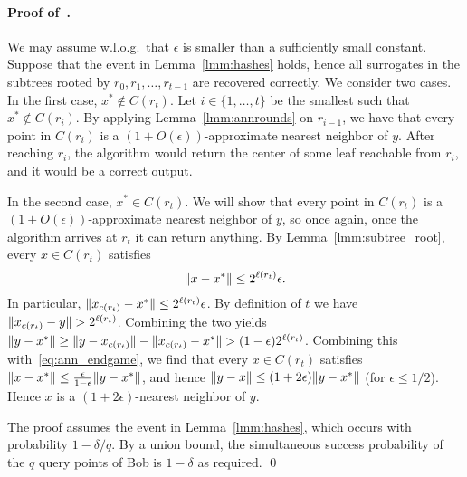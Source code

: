 \paragraph{Proof of~.}
We may assume w.l.o.g.~that $\epsilon$ is smaller than a sufficiently small constant.
Suppose that the event in Lemma~\ref{lmm:hashes} holds, hence all surrogates in the subtrees rooted by $r_0,r_1,\ldots,r_{t-1}$ are recovered correctly.
We consider two cases. In the first case, $x^*\notin C(r_t)$.
Let $i\in\{1,\ldots,t\}$ be the smallest such that $x^*\notin C(r_i)$.
By applying Lemma~\ref{lmm:annrounds} on $r_{i-1}$, we have that every point in $C(r_i)$ is a $(1+O(\epsilon))$-approximate nearest neighbor of $y$. After reaching $r_i$, the algorithm would return the center of some leaf reachable from $r_i$, and it would be a correct output.

In the second case, $x^*\in C(r_t)$. We will show that every point in $C(r_t)$ is a $(1+O(\epsilon))$-approximate nearest neighbor of $y$, so once again, once the algorithm arrives at $r_t$ it can return anything.
By Lemma~\ref{lmm:subtree_root}, every $x\in C(r_t)$ satisfies
\begin{equation}\label{eq:ann_endgame}
\lVert x-x^*\rVert \leq  2^{\ell(r_t)}\epsilon .
\end{equation}
In particular, $\lVert x_{c(r_t)}-x^*\rVert \leq 2^{\ell(r_t)}\epsilon$.
By definition of $t$ we have $\lVert x_{c(r_t)}-y\rVert>2^{\ell(r_t)}$.
Combining the two yields $\lVert y-x^*\rVert \geq \lVert y-x_{c(r_t)}\rVert - \lVert x_{c(r_t)}-x^*\rVert > (1-\epsilon)2^{\ell(r_t)}$. 
Combining this with~\cref{eq:ann_endgame}, we find that every $x\in C(r_t)$ satisfies $\lVert x-x^*\rVert\leq\frac{\epsilon}{1-\epsilon}\lVert y-x^*\rVert$, and hence $\lVert y-x\rVert\leq(1+2\epsilon)\lVert y-x^*\rVert$ (for $\epsilon\leq1/2$). Hence $x$ is a $(1+2\epsilon)$-nearest neighbor of $y$.

The proof assumes the event in Lemma~\ref{lmm:hashes}, which occurs with probability $1-\delta/q$.
By a union bound, the simultaneous success probability of the $q$ query points of Bob is $1-\delta$ as required. \qed

